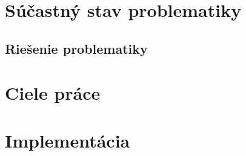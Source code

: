 \section{Súčastný stav problematiky}

\subsection{Riešenie problematiky}

\section{Ciele práce}

\section{Implementácia}


